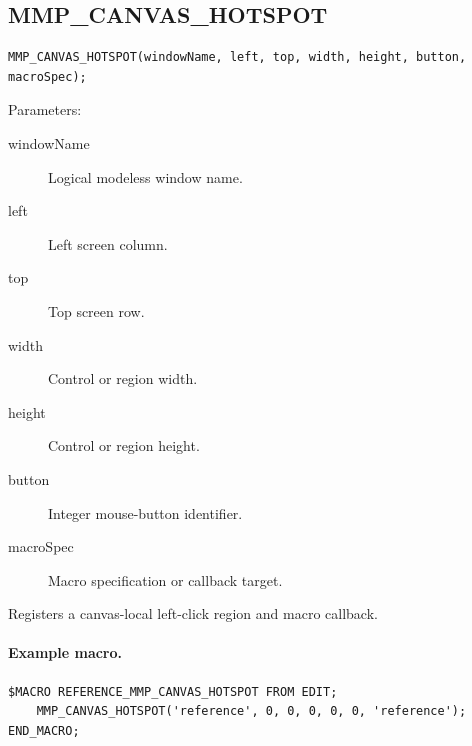 \documentclass[a4paper,10pt,twoside,openany]{book}
\newenvironment{mrmacextension}{\begin{changebar}}{\end{changebar}}
\begin{document}
\begin{mrmacextension}
\label{prim:procedure-mmp-canvas-hotspot}
\subsection*{MMP\_CANVAS\_HOTSPOT}
\begin{verbatim}
MMP_CANVAS_HOTSPOT(windowName, left, top, width, height, button, macroSpec);
\end{verbatim}
Parameters:
\begin{description}
\item[windowName] Logical modeless window name.
\item[left] Left screen column.
\item[top] Top screen row.
\item[width] Control or region width.
\item[height] Control or region height.
\item[button] Integer mouse-button identifier.
\item[macroSpec] Macro specification or callback target.
\end{description}

Registers a canvas-local left-click region and macro callback.

\paragraph{Example macro.}
\begin{verbatim}
$MACRO REFERENCE_MMP_CANVAS_HOTSPOT FROM EDIT;
    MMP_CANVAS_HOTSPOT('reference', 0, 0, 0, 0, 0, 'reference');
END_MACRO;
\end{verbatim}
\end{mrmacextension}
\end{document}
